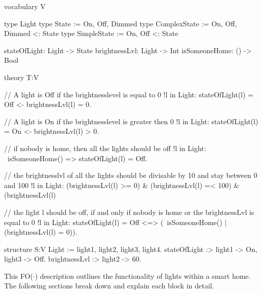 \documentclass[11pt,a4paper]{report}
\newcommand{\fodot}{FO($\cdot$)\xspace}
\begin{document}
\begin{idplisting}
vocabulary V {
    type Light
    type State := {On, Off, Dimmed}
    type ComplexState := {On, Off, Dimmed} <: State
    type SimpleState := {On, Off} <: State
    
    stateOfLight: Light -> State
    brightnessLvl: Light -> Int
    isSomeoneHome: () -> Bool
}

theory T:V {
    {
       // A light is Off if the brightnesslevel is equal to 0
       !l in Light: stateOfLight(l) = Off <- brightnessLvl(l) = 0.
       
       // A light is On if the brightnesslevel is greater then 0
       !l in Light: stateOfLight(l) = On <- brightnessLvl(l) > 0.
    }
    
    // if nobody is home, then all the lights should be off
    !l in Light: ~isSomeoneHome() => stateOfLight(l) = Off.
    
    // the brightnesslvl of all the lights should be divisable by 10 and stay between 0 and 100
    !l in Light: (brightnessLvl(l) >= 0) & (brightnessLvl(l) =< 100) & (brightnessLvl(l) %
    
    // the light l should be off, if and only if nobody is home or the brightnessLvl is equal to 0
    !l in Light: stateOfLight(l) = Off <=> (~isSomeoneHome() | (brightnessLvl(l) = 0)).
}

structure S:V {
    Light := {light1, light2, light3, light4}.
    stateOfLight :> {light1 -> On, light3 -> Off}.
    brightnessLvl :> {light2 -> 60}.
}


\end{idplisting}
This \fodot description outlines the functionality of lights within a smart home. The following sections break down and explain each block in detail.
\end{document}

